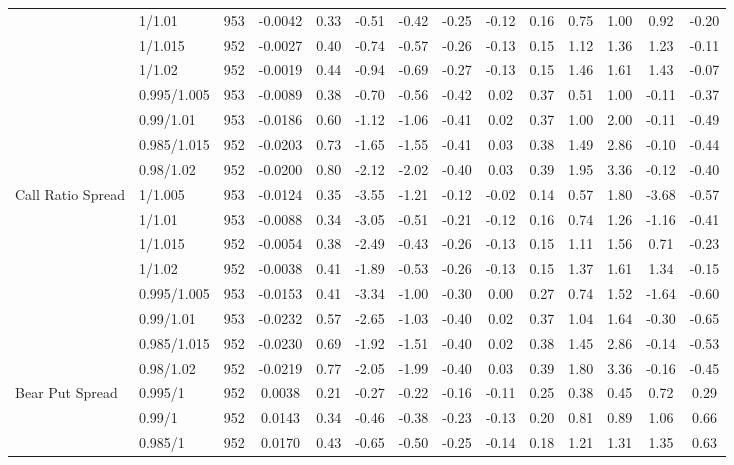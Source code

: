 \begin{tabular}{llcccccccccccc}
 & 1/1.01 & 953 & -0.0042 & 0.33 & -0.51 & -0.42 & -0.25 & -0.12 & 0.16 & 0.75 & 1.00 & 0.92 & -0.20 \\
 & 1/1.015 & 952 & -0.0027 & 0.40 & -0.74 & -0.57 & -0.26 & -0.13 & 0.15 & 1.12 & 1.36 & 1.23 & -0.11 \\
 & 1/1.02 & 952 & -0.0019 & 0.44 & -0.94 & -0.69 & -0.27 & -0.13 & 0.15 & 1.46 & 1.61 & 1.43 & -0.07 \\
 & 0.995/1.005 & 953 & -0.0089 & 0.38 & -0.70 & -0.56 & -0.42 & 0.02 & 0.37 & 0.51 & 1.00 & -0.11 & -0.37 \\
 & 0.99/1.01 & 953 & -0.0186 & 0.60 & -1.12 & -1.06 & -0.41 & 0.02 & 0.37 & 1.00 & 2.00 & -0.11 & -0.49 \\
 & 0.985/1.015 & 952 & -0.0203 & 0.73 & -1.65 & -1.55 & -0.41 & 0.03 & 0.38 & 1.49 & 2.86 & -0.10 & -0.44 \\
 & 0.98/1.02 & 952 & -0.0200 & 0.80 & -2.12 & -2.02 & -0.40 & 0.03 & 0.39 & 1.95 & 3.36 & -0.12 & -0.40 \\
Call Ratio Spread & 1/1.005 & 953 & -0.0124 & 0.35 & -3.55 & -1.21 & -0.12 & -0.02 & 0.14 & 0.57 & 1.80 & -3.68 & -0.57 \\
 & 1/1.01 & 953 & -0.0088 & 0.34 & -3.05 & -0.51 & -0.21 & -0.12 & 0.16 & 0.74 & 1.26 & -1.16 & -0.41 \\
 & 1/1.015 & 952 & -0.0054 & 0.38 & -2.49 & -0.43 & -0.26 & -0.13 & 0.15 & 1.11 & 1.56 & 0.71 & -0.23 \\
 & 1/1.02 & 952 & -0.0038 & 0.41 & -1.89 & -0.53 & -0.26 & -0.13 & 0.15 & 1.37 & 1.61 & 1.34 & -0.15 \\
 & 0.995/1.005 & 953 & -0.0153 & 0.41 & -3.34 & -1.00 & -0.30 & 0.00 & 0.27 & 0.74 & 1.52 & -1.64 & -0.60 \\
 & 0.99/1.01 & 953 & -0.0232 & 0.57 & -2.65 & -1.03 & -0.40 & 0.02 & 0.37 & 1.04 & 1.64 & -0.30 & -0.65 \\
 & 0.985/1.015 & 952 & -0.0230 & 0.69 & -1.92 & -1.51 & -0.40 & 0.02 & 0.38 & 1.45 & 2.86 & -0.14 & -0.53 \\
 & 0.98/1.02 & 952 & -0.0219 & 0.77 & -2.05 & -1.99 & -0.40 & 0.03 & 0.39 & 1.80 & 3.36 & -0.16 & -0.45 \\
Bear Put Spread & 0.995/1 & 952 & 0.0038 & 0.21 & -0.27 & -0.22 & -0.16 & -0.11 & 0.25 & 0.38 & 0.45 & 0.72 & 0.29 \\
 & 0.99/1 & 952 & 0.0143 & 0.34 & -0.46 & -0.38 & -0.23 & -0.13 & 0.20 & 0.81 & 0.89 & 1.06 & 0.66 \\
 & 0.985/1 & 952 & 0.0170 & 0.43 & -0.65 & -0.50 & -0.25 & -0.14 & 0.18 & 1.21 & 1.31 & 1.35 & 0.63 \\

\end{tabular}
